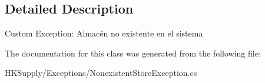 \subsection{Detailed Description}
Custom Exception\+: Almacén no existente en el sistema 



The documentation for this class was generated from the following file\+:\begin{DoxyCompactItemize}
\item 
H\+K\+Supply/\+Exceptions/Nonexistent\+Store\+Exception.\+cs\end{DoxyCompactItemize}

